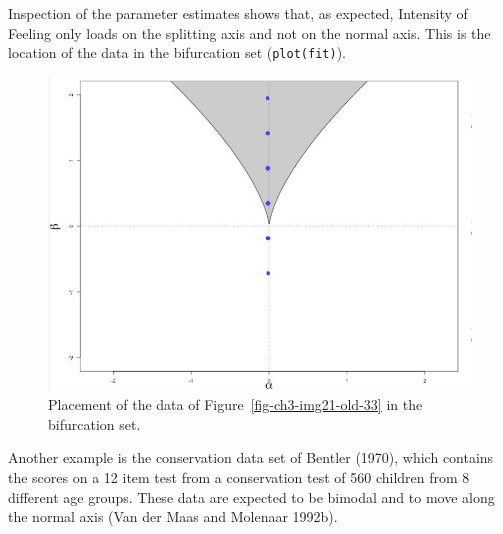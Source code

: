 \documentclass[
  a4paper,
  DIV=11,
  numbers=noendperiod,
  oneside]{scrreprt}
\begin{document}
Inspection of the parameter estimates shows that, as expected, Intensity
of Feeling only loads on the splitting axis and not on the normal axis.
This is the location of the data in the bifurcation set
(\texttt{plot(fit)}).

\begin{figure}

{\centering \includegraphics{media/ch3/image24.jpg}

}

\caption{\label{fig-ch3-img24-old-36}Placement of the data of
Figure~\ref{fig-ch3-img21-old-33} in the bifurcation set.}

\end{figure}

Another example is the conservation data set of Bentler (1970), which
contains the scores on a 12 item test from a conservation test of 560
children from 8 different age groups. These data are expected to be
bimodal and to move along the normal axis (Van der Maas and Molenaar
1992b).
\end{document}
